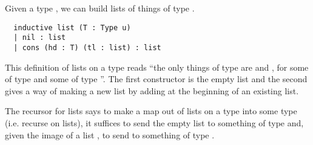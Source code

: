 \begin{dfn}[Lists]

  Given a type , we can build lists of things of type .

  \begin{lstlisting}
  inductive list (T : Type u)
  | nil : list
  | cons (hd : T) (tl : list) : list \end{lstlisting}

  This definition of lists on a type  reads
  ``the only things of type  are
   and ,
  for some  of type 
  and some  of type ''.
  The first constructor is the empty list and the
  second gives a way of making a new list by adding 
  at the beginning of an existing list.
\end{dfn}

The recursor for lists says to make a map out of lists on a type
into some type  (i.e. recurse on lists),
it suffices to send the empty list to something of type 
and, given the image of a list ,
to send  to something of type .
